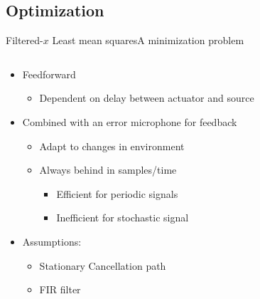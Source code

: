 \subsection{Optimization}
\begin{frame}{Filtered-$x$ Least mean squares}{A minimization problem}
	\begin{columns}
		\begin{column}{0.5\textwidth}		
			
			\begin{itemize}
				\item Feedforward
				\begin{itemize}
					\item Dependent on delay between actuator and source		
				\end{itemize}
				\item Combined with an error microphone for feedback
				\begin{itemize}
					\item Adapt to changes in environment
					\item Always behind in samples/time 		
					\begin{itemize}
						\item Efficient for periodic signals
						\item Inefficient for stochastic signal 
					\end{itemize}	
				\end{itemize}
				\item Assumptions:
				\begin{itemize}
					\item Stationary Cancellation path
					\item FIR filter
				\end{itemize}
				
			\end{itemize}
			
			
		\end{column}
		\begin{column}{0.5\textwidth}
		\end{column}
	\end{columns}
\end{frame}


